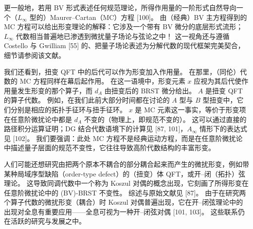 
更一般地，若用 BV 形式表述任何规范理论，所得作用量的一阶形式自然导向一个（$L_\infty$ 型的）Maurer--Cartan（MC）方程 [100]。
由（经典）BV 主方程得到的 MC 方程可以给出形变理论的解释：它涉及一个带有 BV 微分的底层形式流形；$L_\infty$ 代数相当普遍地已渗透到微扰量子场论与弦论之中！
这一视角还与遵循 Costello 与 Gwilliam [55] 的、把量子场论表述为分解代数的现代框架完美契合，细节请参阅该文献。

我们还看到，扭变 QFT 中的后代可以作为形变加入作用量。
在那里，（同伦）代数的 MC 方程同样在幕后起作用。
在这一语境中，形变元素 $x$ 应视为其后代使作用量发生形变的那个算子，而 $d_A$ 由扭变后的 BRST 微分给出。
$A$ 是扭变 QFT 的算子代数。
例如，在我们此前大部分时间都在讨论的 $A$ 型与 $B$ 型扭变中，它们分别是相应的拓扑手征环与扭手征环。
$x$ 是 MC 元素这一事实，等价于形变项在任意阶微扰论中都是 $d_A$ 不变的（物理上，即规范不变的）。
这可以通过直接的路径积分运算证明；DG 结合代数语境下的计算见 [87, 101]，$A_\infty$ 情形下的表达式见 [102]。
我们要强调：此处 MC 方程不是经典运动方程，而是在任意阶微扰论中描述量子层面的规范不变性，它往往导致高阶代数结构的丰富形变。

人们可能还想研究由把两个原本不耦合的部分耦合起来而产生的微扰形变，例如带某种局域序型缺陷（order-type defect）的（扭变）体 QFT，或开--闭（拓扑）弦理论。
这导致同调代数中一个称为 Koszul 对偶的概念出现，它刻画了所得形变在任意阶微扰论中的 (BV)-BRST 不变性。
综述与原始文献见 [87]。
由于在研究两个算子代数的微扰形变（耦合）时 Koszul 对偶普遍出现，它在开--闭弦理论中的出现对全息有重要应用——全息可视为一种开--闭弦对偶 [101, 103]。
这些联系仍在活跃的研究与发展之中。

